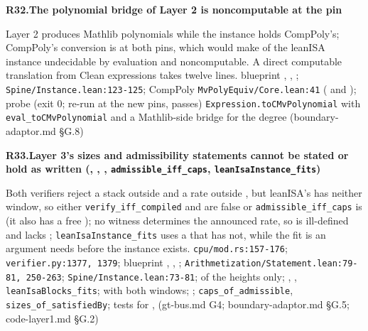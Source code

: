 \par\medskip\noindent\textbf{R32.}\enspace\textbf{The polynomial bridge of Layer 2 is noncomputable at the pin}\par\nopagebreak
{} Layer 2 produces Mathlib polynomials while the instance holds CompPoly's; CompPoly's conversion is  at both pins, which would make  of the leanISA instance undecidable by evaluation and  noncomputable. A direct computable translation from Clean expressions takes twelve lines.
 blueprint , , ; \texttt{Spine/\allowbreak{}Instance.\allowbreak{}lean:\allowbreak{}123-\allowbreak{}125}; CompPoly \texttt{Mv\allowbreak{}Poly\allowbreak{}Equiv/\allowbreak{}Core.\allowbreak{}lean:\allowbreak{}41} ( and ); probe  (exit 0;  re-run at the new pins, passes)
 \texttt{Expression.\allowbreak{}to\allowbreak{}CMv\allowbreak{}Polynomial} with \texttt{eval\_\allowbreak{}to\allowbreak{}CMv\allowbreak{}Polynomial} and a Mathlib-side bridge for the degree (boundary-adaptor.md §G.8)

\par\medskip\noindent\textbf{R33.}\enspace\textbf{Layer 3's sizes and admissibility statements cannot be stated or hold as written (, , , \texttt{admissible\_\allowbreak{}iff\_\allowbreak{}caps}, \texttt{lean\allowbreak{}Isa\allowbreak{}Instance\_\allowbreak{}fits})}\par\nopagebreak
{} Both verifiers reject a stack outside \code{[15, 28]} and a rate outside \code{[1, 4]}, but leanISA's  has neither window, so either \texttt{verify\_\allowbreak{}iff\_\allowbreak{}compiled} and  are false or \texttt{admissible\_\allowbreak{}iff\_\allowbreak{}caps} is (it also has a free ); no witness determines the announced rate, so  is ill-defined and lacks ; \texttt{lean\allowbreak{}Isa\allowbreak{}Instance\_\allowbreak{}fits} uses a  that  has not, while the fit is an argument  needs before the instance exists.
 \texttt{cpu/\allowbreak{}mod.\allowbreak{}rs:\allowbreak{}157-\allowbreak{}176}; \texttt{verifier.\allowbreak{}py:\allowbreak{}1377,\allowbreak{} 1379}; blueprint , , ; \texttt{Arithmetization/\allowbreak{}Statement.\allowbreak{}lean:\allowbreak{}79-\allowbreak{}81,\allowbreak{} 250-\allowbreak{}263}; \texttt{Spine/\allowbreak{}Instance.\allowbreak{}lean:\allowbreak{}73-\allowbreak{}81}; 
  of the heights only; , , \texttt{lean\allowbreak{}Isa\allowbreak{}Blocks\_\allowbreak{}fits};  with both windows; ; \texttt{caps\_\allowbreak{}of\_\allowbreak{}admissible}, \texttt{sizes\_\allowbreak{}of\_\allowbreak{}satisfied\allowbreak{}By}; tests for ,  (gt-bus.md G4; boundary-adaptor.md §G.5; code-layer1.md §G.2)

